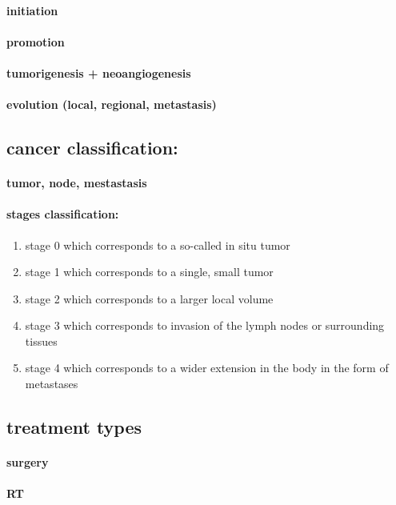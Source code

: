 \paragraph{initiation}
\paragraph{promotion}
\paragraph{tumorigenesis + neoangiogenesis}
\paragraph{evolution (local, regional, metastasis)}

\subsection{cancer classification:}
\paragraph{tumor, node, mestastasis}
\paragraph{stages classification:}
\begin{enumerate}
	\item stage 0 which corresponds to a so-called in situ tumor
	\item stage 1 which corresponds to a single, small tumor
	\item stage 2 which corresponds to a larger local volume
	\item stage 3 which corresponds to invasion of the lymph nodes or surrounding tissues
	\item stage 4 which corresponds to a wider extension in the body in the form of metastases
\end{enumerate}

\subsection{treatment types}
\paragraph{surgery}
\paragraph{RT}
